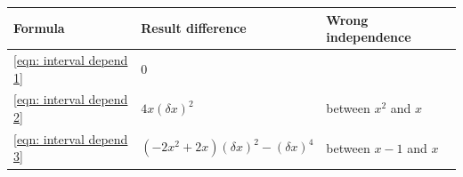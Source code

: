 \documentclass[twoside]{article}
\numberwithin{equation}{section}
\begin{document}
\begin{table}
\centering
\begin{tabular}{|l|l|l|} 
\hline 
Formula & Result difference & Wrong independence \\ 
\hline 
\eqref{eqn: interval depend 1} & $0$ & \\
\hline 
\eqref{eqn: interval depend 2} & $4 x (\delta x)^2$ & between $x^2$ and $x$ \\
\hline 
\eqref{eqn: interval depend 3} & $( - 2 x^2 + 2 x) (\delta x)^2 - (\delta x)^4$ & between $x-1$ and $x$ \\
\hline 
\end{tabular}
\label{tbl: dependency example}
\end{table}
\end{document}
